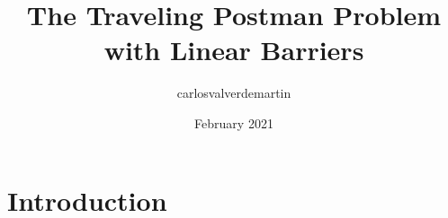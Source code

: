 \documentclass{article}
\title{The Traveling Postman Problem with Linear Barriers}
\author{carlosvalverdemartin }
\date{February 2021}
\begin{document}
\maketitle

\section{Introduction}

%
\end{document}
